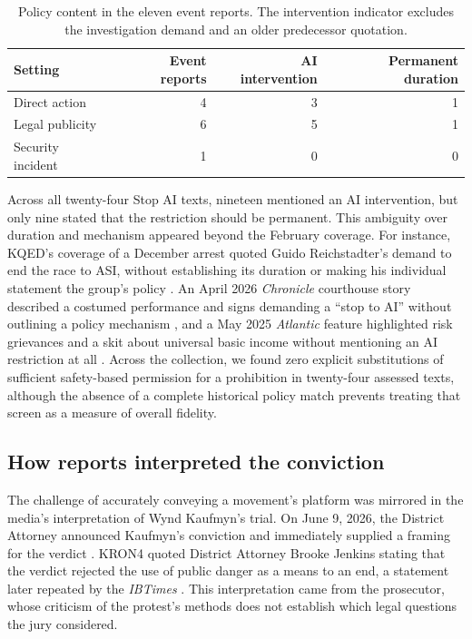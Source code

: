 \documentclass[11pt]{article}
\begin{document}
\begin{table}[!htbp]
\centering\small
\begin{tabularx}{\textwidth}{Y r r r}
\toprule Setting & Event reports & AI intervention & Permanent duration\\\midrule
Direct action & 4 & 3 & 1\\
Legal publicity & 6 & 5 & 1\\
Security incident & 1 & 0 & 0\\
\bottomrule
\end{tabularx}
\caption{Policy content in the eleven event reports. The intervention indicator excludes the investigation demand and an older predecessor quotation.}
\label{tab:visibility}
\end{table}

Across all twenty-four Stop AI texts, nineteen mentioned an AI intervention, but only nine stated that the restriction should be permanent. This ambiguity over duration and mechanism appeared beyond the February coverage. For instance, KQED's coverage of a December arrest quoted Guido Reichstadter's demand to end the race to ASI, without establishing its duration or making his individual statement the group's policy \citep{krans}. An April 2026 \textit{Chronicle} courthouse story described a costumed performance and signs demanding a ``stop to AI'' without outlining a policy mechanism \citep{courthouse}, and a May 2025 \textit{Atlantic} feature highlighted risk grievances and a skit about universal basic income without mentioning an AI restriction at all \citep{wong}. Across the collection, we found zero explicit substitutions of sufficient safety-based permission for a prohibition in twenty-four assessed texts, although the absence of a complete historical policy match prevents treating that screen as a measure of overall fidelity.

\subsection{How reports interpreted the conviction}
\label{sec:trial}
The challenge of accurately conveying a movement's platform was mirrored in the media's interpretation of Wynd Kaufmyn's trial. On June 9, 2026, the District Attorney announced Kaufmyn's conviction and immediately supplied a framing for the verdict \citep{da}. KRON4 quoted District Attorney Brooke Jenkins stating that the verdict rejected the use of public danger as a means to an end, a statement later repeated by the \textit{IBTimes} \citep{kron,ib17}. This interpretation came from the prosecutor, whose criticism of the protest's methods does not establish which legal questions the jury considered.
\end{document}

